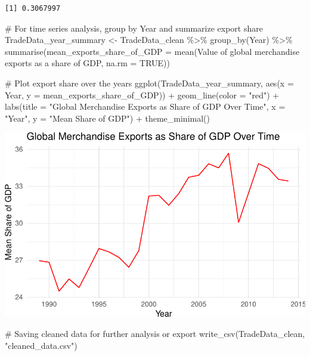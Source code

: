 \documentclass[
  10pt,
]{article}
\newenvironment{Shaded}{\begin{snugshade}}{\end{snugshade}}
\newcommand{\AttributeTok}[1]{\textcolor[rgb]{0.40,0.45,0.13}{#1}}
\newcommand{\CommentTok}[1]{\textcolor[rgb]{0.37,0.37,0.37}{#1}}
\newcommand{\ConstantTok}[1]{\textcolor[rgb]{0.56,0.35,0.01}{#1}}
\newcommand{\FunctionTok}[1]{\textcolor[rgb]{0.28,0.35,0.67}{#1}}
\newcommand{\NormalTok}[1]{\textcolor[rgb]{0.00,0.23,0.31}{#1}}
\newcommand{\OtherTok}[1]{\textcolor[rgb]{0.00,0.23,0.31}{#1}}
\newcommand{\SpecialCharTok}[1]{\textcolor[rgb]{0.37,0.37,0.37}{#1}}
\newcommand{\StringTok}[1]{\textcolor[rgb]{0.13,0.47,0.30}{#1}}
\begin{document}
\begin{verbatim}
[1] 0.3067997
\end{verbatim}

\begin{Shaded}
\begin{Highlighting}[]
\CommentTok{\# For time series analysis, group by Year and summarize export share}
\NormalTok{TradeData\_year\_summary }\OtherTok{\textless{}{-}}\NormalTok{ TradeData\_clean }\SpecialCharTok{\%\textgreater{}\%}
  \FunctionTok{group\_by}\NormalTok{(Year) }\SpecialCharTok{\%\textgreater{}\%}
  \FunctionTok{summarise}\NormalTok{(}\AttributeTok{mean\_exports\_share\_of\_GDP =} \FunctionTok{mean}\NormalTok{(}\StringTok{\textasciigrave{}}\AttributeTok{Value of global merchandise exports as a share of GDP}\StringTok{\textasciigrave{}}\NormalTok{, }\AttributeTok{na.rm =} \ConstantTok{TRUE}\NormalTok{))}

\CommentTok{\# Plot export share over the years}
\FunctionTok{ggplot}\NormalTok{(TradeData\_year\_summary, }\FunctionTok{aes}\NormalTok{(}\AttributeTok{x =}\NormalTok{ Year, }\AttributeTok{y =}\NormalTok{ mean\_exports\_share\_of\_GDP)) }\SpecialCharTok{+}
  \FunctionTok{geom\_line}\NormalTok{(}\AttributeTok{color =} \StringTok{"red"}\NormalTok{) }\SpecialCharTok{+}
  \FunctionTok{labs}\NormalTok{(}\AttributeTok{title =} \StringTok{"Global Merchandise Exports as Share of GDP Over Time"}\NormalTok{, }
       \AttributeTok{x =} \StringTok{"Year"}\NormalTok{, }
       \AttributeTok{y =} \StringTok{"Mean Share of GDP"}\NormalTok{) }\SpecialCharTok{+}
  \FunctionTok{theme\_minimal}\NormalTok{()}
\end{Highlighting}
\end{Shaded}

\includegraphics{draft_1_files/figure-pdf/unnamed-chunk-23-2.pdf}

\begin{Shaded}
\begin{Highlighting}[]
\CommentTok{\# Saving cleaned data for further analysis or export}
\FunctionTok{write\_csv}\NormalTok{(TradeData\_clean, }\StringTok{"cleaned\_data.csv"}\NormalTok{)}
\end{Highlighting}
\end{Shaded}
\end{document}
